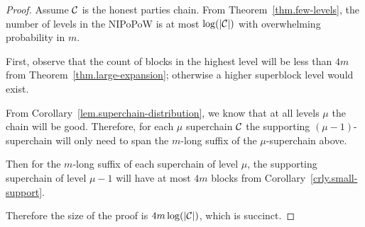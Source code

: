 \begin{proof}
    Assume $\mathcal{C}$ is the honest parties chain. From
    Theorem~\ref{thm.few-levels}, the number of levels in the NIPoPoW is at most
    $\log(|\mathcal{C}|)$ with overwhelming probability in $m$.

    First, observe that the count of blocks in the highest level will be less
    than $4m$ from Theorem~\ref{thm.large-expansion}; otherwise a higher
    superblock level would exist.

    From Corollary~\ref{lem.superchain-distribution}, we know that at all
    levels $\mu$ the chain will be good. Therefore, for each $\mu$ superchain
    $\mathcal{C}$ the supporting $(\mu - 1)$-superchain will only need to span the
    $m$-long suffix of the $\mu$-superchain above.

    Then for the $m$-long suffix of each superchain of level $\mu$, the
    supporting superchain of level $\mu - 1$ will have at most $4m$ blocks from
    Corollary~\ref{crly.small-support}.

    Therefore the size of the proof is $4m \log(|\mathcal{C}|)$, which is succinct.
    \Qed
\end{proof}
